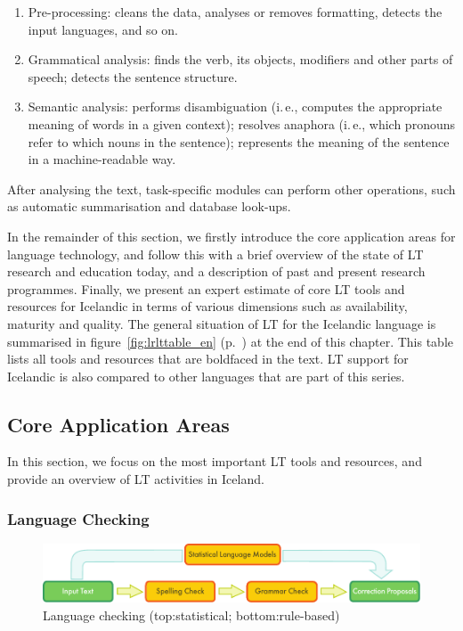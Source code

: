 \begin{multicols}{2}
\begin{enumerate}
\item Pre-processing: cleans the data, analyses or removes formatting, detects the input languages, and so on.
\item Grammatical analysis: finds the verb, its objects, modifiers and other parts of speech; detects the sentence structure.
\item Semantic analysis: performs disambiguation (i.\,e., computes the appropriate meaning of words in a given context); resolves anaphora (i.\,e., which pronouns refer to which nouns in the sentence); represents the meaning of the sentence in a machine-readable way.
\end{enumerate}

After analysing the text, task-specific modules can perform other operations, such as automatic summarisation and database look-ups.

In the remainder of this section, we firstly introduce the core application areas for language technology, and follow this with a brief overview of the state of LT research and education today, and a description of past and present research programmes. Finally, we present an expert estimate of core LT tools and resources for Icelandic in terms of various dimensions such as availability, maturity and quality. The general situation of LT for the Icelandic language is summarised in figure~\ref{fig:lrlttable_en} (p.~\pageref{fig:lrlttable_en}) at the end of this chapter. This table lists all tools and resources that are boldfaced in the text. LT support for Icelandic is also compared to other languages that are part of this series.

\subsection{Core Application Areas}

In this section, we focus on the most important LT tools and resources, and provide an overview of LT activities in Iceland. 

\subsubsection{Language Checking}

\begin{figure}[t]
  \center
  \includegraphics[width=\textwidth]{../_media/english/language_checking}
  \caption{Language checking (top:statistical; bottom:rule-based)}
\label{fig:langcheckingaarch_en}
\end{figure}


\end{multicols}
